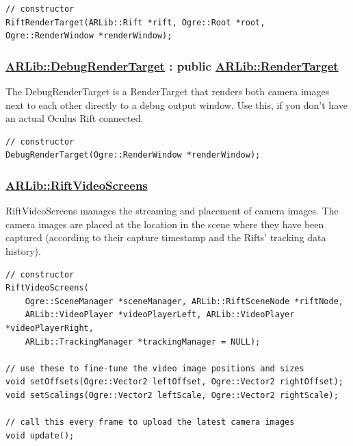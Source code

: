 \documentclass[]{article}
\begin{document}
\begin{verbatim}
// constructor
RiftRenderTarget(ARLib::Rift *rift, Ogre::Root *root, Ogre::RenderWindow *renderWindow);
\end{verbatim}

\subsubsection{\texorpdfstring{\href{https://github.com/ands/OculusMeetsAR/blob/master/ARLib/include/ARLib/Ogre/DebugRenderTarget.h}{ARLib::DebugRenderTarget}
: public
\href{https://github.com/ands/OculusMeetsAR/blob/master/ARLib/include/ARLib/Ogre/RenderTarget.h}{ARLib::RenderTarget}}{ARLib::DebugRenderTarget : public ARLib::RenderTarget}}\label{arlibdebugrendertarget-public-arlibrendertarget}

The DebugRenderTarget is a RenderTarget that renders both camera images
next to each other directly to a debug output window. Use this, if you
don't have an actual Oculus Rift connected.

\begin{verbatim}
// constructor
DebugRenderTarget(Ogre::RenderWindow *renderWindow);
\end{verbatim}

\subsubsection{\texorpdfstring{\href{https://github.com/ands/OculusMeetsAR/blob/master/ARLib/include/ARLib/Ogre/RiftVideoScreens.h}{ARLib::RiftVideoScreens}}{ARLib::RiftVideoScreens}}\label{arlibriftvideoscreens}

RiftVideoScreens manages the streaming and placement of camera images.
The camera images are placed at the location in the scene where they
have been captured (according to their capture timestamp and the Rifts'
tracking data history).

\begin{verbatim}
// constructor
RiftVideoScreens(
    Ogre::SceneManager *sceneManager, ARLib::RiftSceneNode *riftNode,
    ARLib::VideoPlayer *videoPlayerLeft, ARLib::VideoPlayer *videoPlayerRight,
    ARLib::TrackingManager *trackingManager = NULL);

// use these to fine-tune the video image positions and sizes
void setOffsets(Ogre::Vector2 leftOffset, Ogre::Vector2 rightOffset);
void setScalings(Ogre::Vector2 leftScale, Ogre::Vector2 rightScale);

// call this every frame to upload the latest camera images
void update();
\end{verbatim}
\end{document}
